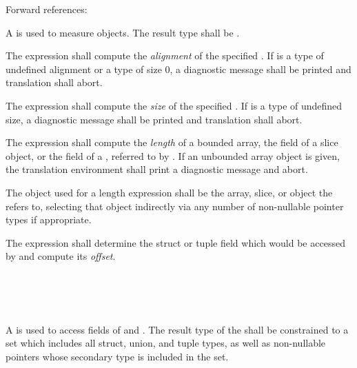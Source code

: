 Forward references: 

\specsubsubitem
A  is used to measure objects. The result
type shall be .

\specsubsubitem
The  expression shall compute the \textit{alignment} of the specified
. If  is a type of undefined alignment or a
type of size 0, a diagnostic message shall be printed and translation shall
abort.

\specsubsubitem
The  expression shall compute the \textit{size} of the specified
. If  is a type of undefined size, a
diagnostic message shall be printed and translation shall abort.

\specsubsubitem
The  expression shall compute the \textit{length} of a bounded
array, the  field of a slice object, or the  field of
a , referred to by . If an unbounded array
object is given, the translation environment shall print a diagnostic message
and abort.

\specsubsubitem
The object used for a length expression shall be the array, slice, or
 object the  refers to, selecting that
object indirectly via any number of non-nullable pointer types if appropriate.

\specsubsubitem
The  expression shall determine the struct or tuple field
which would be accessed by  and compute
its \textit{offset}.


\begin{grammar}
 \\
	   \\
	   \\
\end{grammar}

\specsubsubitem
A  is used to access fields of
 and . The result type
of the  shall be constrained to a set which
includes all struct, union, and tuple types, as well as non-nullable pointers
whose secondary type is included in the set.

